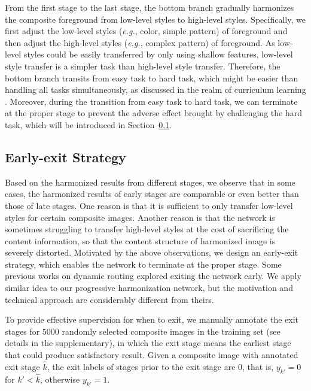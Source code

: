 \documentclass[letterpaper]{article} %
\begin{document}
From the first stage to the last stage, the bottom branch gradually harmonizes the composite foreground from low-level styles to high-level styles. Specifically, we first adjust the low-level styles (\emph{e.g.}, color, simple pattern) of foreground and then adjust the high-level styles (\emph{e.g.}, complex pattern) of foreground. As low-level styles could be easily transferred by only using shallow features, low-level style transfer is a simpler task than high-level style transfer. Therefore, the bottom branch transits from easy task to hard task, which might be easier than handling all tasks simultaneously, as discussed in the realm of curriculum learning \cite{bengio2009curriculum}. Moreover, during the transition from easy task to hard task, we can terminate at the proper stage to prevent the adverse effect brought by challenging the hard task, which will be introduced in Section~\ref{sec:early_exit}. 


\subsection {Early-exit Strategy} \label{sec:early_exit}

Based on the harmonized results from different stages, we observe that in some cases, the harmonized results of early stages are comparable or even better than those of late stages. One reason is that it is sufficient to only transfer low-level styles for certain composite images. Another reason is that the network is sometimes struggling to transfer high-level styles at the cost of sacrificing the content information, so that the content structure of harmonized image is severely distorted. Motivated by the above observations, we design an early-exit strategy, which enables the network to terminate at the proper stage. Some previous works \cite{huangmulti,teerapittayanon2016branchynet,bolukbasi2017adaptive,mcgill2017deciding,jie2019anytime,li2019improved,figurnov2017spatially,leroux2018iamnn} on dynamic routing explored  exiting the network early. We apply similar idea to our progressive harmonization network, but the motivation and technical approach are considerably different from theirs.    

To provide effective supervision for when to exit, we manually annotate the exit stages for $5000$ randomly selected composite images in the training set (see details in the supplementary), in which the exit stage means the earliest stage that could produce satisfactory result. Given a composite image with annotated exit stage $\hat{k}$, the exit labels of stages prior to the exit stage are $0$, that is, $y_{k'}=0$ for $k'<\hat{k}$,  otherwise $y_{k'}=1$. 
\end{document}
